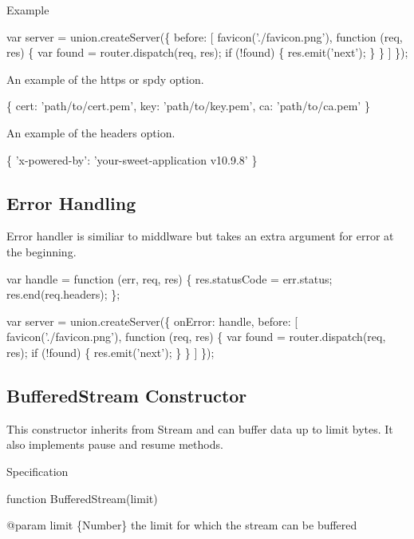 Example


\begin{DoxyCode}
var server = union.createServer(\{
  before: [
    favicon('./favicon.png'),
    function (req, res) \{
      var found = router.dispatch(req, res);
      if (!found) \{
        res.emit('next');
      \}
    \}
  ]
\});
\end{DoxyCode}


An example of the {\ttfamily https} or {\ttfamily spdy} option.


\begin{DoxyCode}
\{
  cert: 'path/to/cert.pem',
  key: 'path/to/key.pem',
  ca: 'path/to/ca.pem'
\}
\end{DoxyCode}


An example of the {\ttfamily headers} option.


\begin{DoxyCode}
\{
  'x-powered-by': 'your-sweet-application v10.9.8'
\}
\end{DoxyCode}


\subsection*{Error Handling}

Error handler is similiar to middlware but takes an extra argument for error at the beginning.


\begin{DoxyCode}
var handle = function (err, req, res) \{
  res.statusCode = err.status;
  res.end(req.headers);
\};

var server = union.createServer(\{
  onError: handle,
  before: [
    favicon('./favicon.png'),
    function (req, res) \{
      var found = router.dispatch(req, res);
      if (!found) \{
        res.emit('next');
      \}
    \}
  ]
\});
\end{DoxyCode}


\subsection*{Buffered\+Stream Constructor}

This constructor inherits from {\ttfamily Stream} and can buffer data up to {\ttfamily limit} bytes. It also implements {\ttfamily pause} and {\ttfamily resume} methods.

Specification


\begin{DoxyCode}
function BufferedStream(limit)

@param limit \{Number\}
the limit for which the stream can be buffered
\end{DoxyCode}


